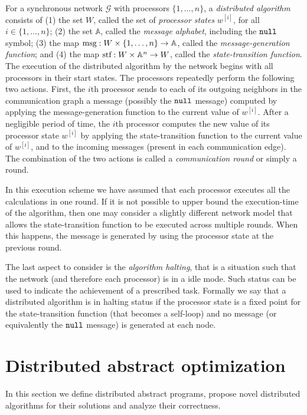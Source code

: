 \documentclass[onecolumn,journal,letterpaper]{IEEEtran}
\newcommand{\map}[3]{#1: #2 \rightarrow #3}
\newcommand{\alphabet}{\mathbb{A}}
\newcommand{\GG}{\mathcal{G}}
\newcommand{\until}[1]{\{1,\dots,#1\}}
\newcommand{\supind}[2]{{#1}^{[#2]}}
\newcommand{\nll}{\textup{\texttt{null}}\xspace}
\newcommand{\msg}{\textup{msg}}
\newcommand{\stf}{\textup{stf}}
\begin{document}
For a synchronous network $\GG$ with processors $\until{n}$, a
\emph{distributed algorithm} consists of (1) the set $W$, called the set of
\emph{processor states} $\supind{w}{i}$, for all $i\in\until{n}$; (2) the
set $\alphabet$, called the \emph{message alphabet}, including the $\nll$
symbol; (3) the map $\map{\msg}{W \times\until{n}}{\alphabet}$, called the
\emph{message-generation function}; and (4) the map $\map{\stf}{W
  \times\alphabet^n}{W}$, called the \emph{state-transition function}.
The execution of the distributed algorithm by the network begins with all
processors in their start states.  The processors repeatedly perform the
following two actions. First, the $i$th processor sends to each of its
outgoing neighbors in the communication graph a message (possibly the
$\nll$ message) computed by applying the message-generation function to the
current value of $\supind{w}{i}$.  After a negligible period of time, the
$i$th processor computes the new value of its processor state
$\supind{w}{i}$ by applying the state-transition function to the current
value of $\supind{w}{i}$, and to the incoming messages (present in each
communication edge). The combination of the two actions is called a
\emph{communication round} or simply a round.

In this execution scheme we have assumed that each processor executes all
the calculations in one round. If it is not possible to upper bound the
execution-time of the algorithm, then one may consider a slightly different
network model that allows the state-transition function to be executed
across multiple rounds. When this happens, the message is generated by
using the processor state at the previous round.

The last aspect to consider is the \emph{algorithm halting}, that is a
situation such that the network (and therefore each processor) is in a idle
mode.  Such status can be used to indicate the achievement of a prescribed
task.  Formally we say that a distributed algorithm is in halting status if
the processor state is a fixed point for the state-transition function
(that becomes a self-loop) and no message (or equivalently the $\nll$
message) is generated at each node.


\section{Distributed abstract optimization}
\label{sec:network-ALP}
In this section we define distributed abstract programs, propose novel
distributed algorithms for their solutions and analyze their correctness.
\end{document}
